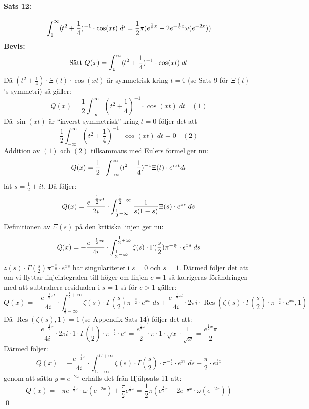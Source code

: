 \documentclass[a4paper]{article}%
\begin{document}
\paragraph{Sats 12:} 
\[
	\int_0^\infty (t^2 + \frac 1 4)^{-1} \cdot \cos(xt) \; dt = \frac 1 2 \pi(e^{\frac 1 2 x} -
		2e^{-\frac 1 2 x} \omega(e^{- 2 x}))
\]
{\bf Bevis:}\\
\[
	\text{Sätt } Q(x) = \int_0^\infty (t^2 + \frac 1 4)^{-1} \cdot \cos(xt) \; dt
\]
Då $(t^2 + \frac 1 4) \cdot \Xi(t) \cdot \cos(xt)$ är symmetrisk kring $t = 0$ (se Sats 9 för $\Xi(t)$'s symmetri)
så gäller:
\newcommand{\mQ} {
	\frac 1 2 \twelve{\infty}
}
\[
	Q(x) = \frac 1 2 \int_{-\infty}^\infty (t^2 + \frac 1 4)^{-1} \cdot \cos(xt) \; dt \quad (1)
\]
Då $\sin(xt)$ är ``inverst symmetrisk'' kring $t = 0$ följer det att 
\[
	\frac 1 2 \int_{-\infty}^\infty (t^2 + \frac 1 4)^{-1} \cdot \cos(xt) \; dt = 0 \quad (2)
\]
Addition av $(1)$ och $(2)$ tillsammans med Eulers formel ger nu: 
\[
	Q(x) = \frac 1 2 \cdot \int_{-\infty}^{\infty} (t^2 + \frac 1 4)^{-1} \Xi(t) \cdot e^{ixt} \- dt
\]
låt $s = \frac 1 2 + it$. Då följer:
\[
	Q(x) = \frac {
		e^{- \tfrac 1 2 x t}
	} {
		2i
	} \cdot \int_{\tfrac 1 2 - \infty}^{\tfrac 1 2 + \infty}
		\frac {1} {s(1-s)} \Xi(s) \cdot e^{xs} \; ds
\]
Definitionen av $\Xi(s)$ på den kritiska linjen ger nu:
\[
	Q(x) = - \frac {
		e^{- \frac 1 2 xt}
	} {
		4i
	} \cdot \int_{\tfrac 1 2 - \infty}^{\tfrac 1 2 + \infty} \zeta(s) \cdot \Gamma(\frac s 2)
		\pi^{- \frac s 2} \cdot e^{xs} \; ds
\]
$z(s) \cdot \Gamma(\frac s 2) \pi^{- \frac s 0} \cdot e^{xs}$ har singulariteter i $s = 0$ och $s = 1$.
Därmed följer det att om vi flyttar linjeintegralen till höger om linjen $c=1$ så korrigeras förändringen med att 
subtrahera residualen i $s = 1$ så för $c > 1$ gäller:
\[
	Q(x) = - \frac {e^{- \frac 1 2 xt}} {4i} \cdot \int_{\tfrac 1 2 - \infty}^{\tfrac 1 2 + \infty} \zeta(s) \cdot \Gamma
		(\frac s 2)
		\pi^{- \frac s 2} \cdot e^{xs} \; ds + \frac {e^{- \frac 1 2 xt}} {4i} \cdot2 \pi i \cdot \operatorname{Res}(\zeta(s) \cdot
		\Gamma(\frac s 2) \cdot \pi^{-\frac s 2} \cdot e^{xs}, 1)
\]
Då $\operatorname{Res}(\zeta(s), 1) = 1$ (se Appendix Sats 14) följer det att:
\[
	\frac {e^{- \frac 1 2 x}} {4i} \cdot 2 \pi i \cdot 1 \cdot \Gamma(\frac 1 2) \cdot \pi^{- \frac 1 2} \cdot e^x =
		\frac {e^{\frac 1 2 x}} {2} \cdot \pi \cdot 1 \cdot \sqrt{x} \cdot \frac {1} {\sqrt{x}} = \frac {e^{\frac 1 2 x} \pi} {2}
\]
Därmed följer:
\[
	Q(x) = - \frac {e^{-\frac 1 2 x}} {4 i} \cdot \int_{C - \infty}^{C + \infty} \zeta(s) \cdot \Gamma(\frac s 2)
		\cdot \pi^{- \frac 1 2} \cdot e^{xs} \; ds + \frac \pi 2 \cdot e^{\frac 1 2 x}
\]
genom att sätta $y = e^{-2x}$ erhålls det från Hjälpsats 11 att:
\[
	Q(x) = - \pi e^{- \frac 1 2 x} \cdot \omega(e^{- 2 x}) + \frac \pi 2 e^{\frac 1 2 x} = \frac 1 2 \pi
		(e^{\frac 1 2 x} - 2 e^{- \frac 1 2 x} \cdot \omega(e^{-2x}))
\]
\hfill \qed
\end{document}
